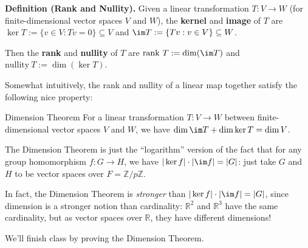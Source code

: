\textbf{Definition (Rank and Nullity).} Given a linear transformation $T: V \to W$ (for finite-dimensional vector spaces $V$ and $W$), the \textbf{kernel} and \textbf{image} of $T$ are $\ker T := \{ v \in V: Tv = 0\} \subseteq V$ and $\im T := \{Tv : v \in V\} \subseteq W$.

Then the \textbf{rank} and \textbf{nullity} of $T$ are $\mathrm{rank} \ T := \dim(\im T)$ and $\mathrm{nullity} \ T := \dim(\ker T)$.

Somewhat intuitively, the rank and nullity of a linear map together satisfy the following nice property:

\begin{theorem}{Dimension Theorem}
    For a linear transformation $T: V \to W$ between finite-dimensional vector spaces $V$ and $W$, we have $\dim \im T + \dim \ker T = \dim V$.
\end{theorem}

\begin{remark}
    The Dimension Theorem is just the ``logarithm'' version of the fact that for any group homomorphism $f: G \to H$, we have $| \ker f | \cdot | \im f | = |G|$: just take $G$ and $H$ to be vector spaces over $F = \mathbb{Z} / p \mathbb{Z}$.

    In fact, the Dimension Theorem is \emph{stronger} than $| \ker f | \cdot | \im f | = |G|$, since dimension is a stronger notion than cardinality: $\mathbb{R}^2$ and $\mathbb{R}^3$ have the same cardinality, but as vector spaces over $\mathbb{R}$, they have different dimensions!
\end{remark}

We'll finish class by proving the Dimension Theorem.

